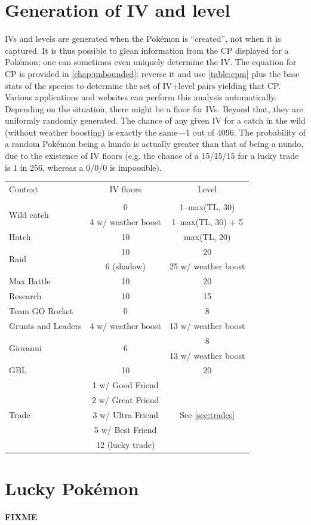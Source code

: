 \section{Generation of IV and level}
\label{sec:ivgeneration}
IVs and levels are generated when the Pokémon is ``created'', not when it is captured.
It is thus possible to glean information from the CP displayed for a Pokémon;
  one can sometimes even uniquely determine the IV\@.
The equation for CP is provided in \autoref{chap:unbounded}; reverse it and
  use \autoref{table:cpm} plus the base stats of the species to determine
  the set of IV+level pairs yielding that CP\@.
Various applications and websites can perform this analysis automatically.
Depending on the situation, there might be a floor for IVs.
Beyond that, they are uniformly randomly generated.
The chance of any given IV for a catch in the wild (without weather boosting)
  is exactly the same---1 out of 4096.
The probability of a random Pokémon being a hundo is actually
  greater than that of being a nundo, due to the existence of IV floors
  (e.g. the chance of a 15/15/15 for a lucky trade is 1 in 256, whereas
  a 0/0/0 is impossible).
\begin{table}
  \begin{center}
    \begin{tabular}{lcc}
      Context & IV floors & Level \\
      \Midrule \\
      \multirow{2}{*}{Wild catch} & 0 & 1--max(TL, 30) \\
      & 4 w/ weather boost & 1--max(TL, 30) + 5 \\
      Hatch & 10 & max(TL, 20) \\
      \multirow{2}{*}{Raid} & 10 & 20 \\
      & 6 (shadow) & 25 w/ weather boost \\
      Max Battle & 10 & 20 \\
      Research & 10 & 15 \\
      Team GO Rocket & 0 & 8 \\
      Grunts and Leaders & 4 w/ weather boost & 13 w/ weather boost \\
      \multirow{2}{*}{Giovanni} & \multirow{2}{*}{6} & 8\\
       & & 13 w/ weather boost\\
      GBL & 10 & 20\\
      \multirow{5}{*}{Trade} & 1 w/ Good Friend & \multirow{5}{*}{See \autoref{sec:trades}} \\
       & 2 w/ Great Friend & \\
       & 3 w/ Ultra Friend & \\
       & 5 w/ Best Friend & \\
       & 12 (lucky trade) & \\
    \end{tabular}
  \end{center}
\end{table}

\section{Lucky Pokémon}
\label{sec:lucky}
\textbf{FIXME}

